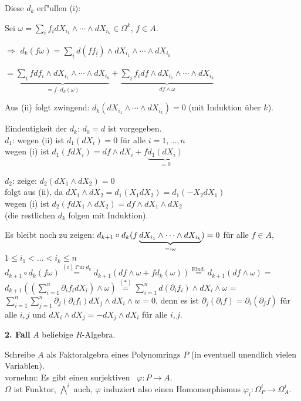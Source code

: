 \documentclass[a4paper, 10pt]{report}
\begin{document}
\begin{SatzDef}
\begin{Bew}
Diese $d_k$ erf"ullen (i):

Sei $\omega = \sum_{\underline{i}} f_{\underline{i}} dX_{i_1} \wedge \cdots \wedge dX_{i_k} \in \Omega^k$, $f \in A$.

$\Rightarrow$ $d_k(f \omega) = \sum_{\underline{i}} d(f f_{\underline{i}}) \wedge dX_{i_1} \wedge \cdots \wedge dX_{i_k}$

$= \underbrace{ \sum_{\underline{i}} f df_i \wedge dX_{i_1} \wedge \cdots \wedge dX_{i_k} }_{= f \cdot d_k(\omega)} + \underbrace{ \sum_{\underline{i}} f_i df \wedge dX_{i_1} \wedge \cdots \wedge dX_{i_k} }_{d f \wedge \omega}$

Aus (ii) folgt zwingend: $d_k(dX_{i_1}\wedge \cdots \wedge dX_{i_k}) = 0$ (mit 
Induktion \"uber $k$).

Eindeutigkeit der $d_k$: $d_0=d$ ist vorgegeben.\\
$d_1$: wegen (ii) ist $d_1(dX_i)=0$ f\"ur alle $i=1, \ldots, n$\\
wegen (i) ist $d_1(fdX_i)=df\wedge dX_i+f\underbrace{d_1(dX_i)}_{=0}$

$d_2$: zeige: $d_2(dX_1\wedge dX_2)=0$\\
folgt aus (ii), da $dX_1\wedge dX_2=d_1(X_1 dX_2)=d_1(-X_2dX_1)$\\
wegen (i) ist $d_2(fdX_1\wedge dX_2)=df\wedge dX_1\wedge dX_2$\\
(die restlichen $d_k$ folgen mit Induktion).

Es bleibt noch zu zeigen: $d_{k+1}\circ d_k(f\underbrace{dX_{i_1}\wedge \cdots
\wedge
dX_{i_k}}_{=\mathrel{\mathop:} \omega})=0$ f\"ur alle $f\in A$, $1\leq i_1<\dots<i_k\leq n$\\
$d_{k+1}\circ d_k(f\omega)
\stackrel{(i)\ \text{f"ur}\ d_k}{=}d_{k+1}(df\wedge \omega +fd_k(\omega))
\stackrel{\text{Eind.}}{=}d_{k+1}(df\wedge \omega) 
=$\\
$d_{k+1}\left(\left(\sum_{i=1}^{n}\partial_i f_i dX_i\right)\wedge
\omega\right)
\stackrel{(\ast)}{=}\sum_{i=1}^{n}d(\partial_if_i)\wedge dX_i\wedge \omega=$\\
$\sum_{i=1}^n \sum_{j=1}^n \partial_j (\partial_i f_i)dX_j\wedge dX_{i}\wedge w=0$,
denn es ist $\partial_j(\partial_i f) = \partial_i(\partial_j f)$ f\"ur alle $i,j$
und $dX_i\wedge dX_j=-dX_j\wedge dX_i$ f\"ur alle $i,j$.

\textbf{2. Fall} $A$ beliebige $R$-Algebra.

Schreibe $A$ als Faktoralgebra eines Polynomrings $P$ (in eventuell unendlich vielen Variablen).\\
vornehm: Es gibt einen surjektiven \RAlgHom\ $\varphi:P\to A$.\\
$\Omega$ ist Funktor, $\bigwedge\nolimits^i$ auch, $\varphi$ induziert also einen Homomorphismus 
$\varphi_i: \Omega_P^{i}\to \Omega_A^{i}$.


\end{Bew}
\end{SatzDef}
\end{document}
